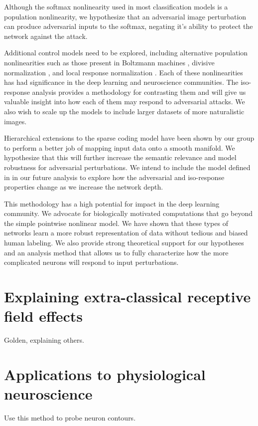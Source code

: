 Although the softmax nonlinearity used in most classification models is a population nonlinearity, we hypothesize that an adversarial image perturbation can produce adversarial inputs to the softmax, negating it's ability to protect the network against the attack.

Additional control models need to be explored, including alternative population nonlinearities such as those present in Boltzmann machines \parencite{salakhutdinov2009deep}, divisive normalization \parencite{balle2016end}, and local response normalization \parencite{krizhevsky2012imagenet}. Each of these nonlinearities has had significance in the deep learning and neuroscience communities. The iso-response analysis provides a methodology for contrasting them and will give us valuable insight into how each of them may respond to adversarial attacks. We also wish to scale up the models to include larger datasets of more naturalistic images. 

Hierarchical extensions to the sparse coding model \parencite{chen2018sparse} have been shown by our group to perform a better job of mapping input data onto a smooth manifold. We hypothesize that this will further increase the semantic relevance and model robustness for adversarial perturbations. We intend to include the model defined in \parencite{chen2018sparse} in our future analysis to explore how the adversarial and iso-response properties change as we increase the network depth.

This methodology has a high potential for impact in the deep learning community. We advocate for biologically motivated computations that go beyond the simple pointwise nonlinear model. We have shown that these types of networks learn a more robust representation of data without tedious and biased human labeling. We also provide strong theoretical support for our hypotheses and an analysis method that allows us to fully characterize how the more complicated neurons will respond to input perturbations.

\section{Explaining extra-classical receptive field effects}
Golden, explaining others.


\section{Applications to physiological neuroscience}
Use this method to probe neuron contours.